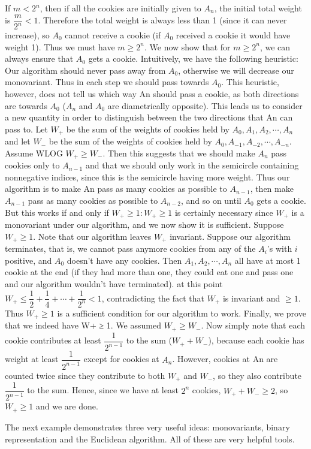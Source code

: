 \documentclass[a4paper,11pt]{book}
\begin{document}
\begin{soln}
If $m < 2^n$, then if all the cookies are initially given to $A_n$, the
initial total weight is $\dfrac{m}{2^n}< 1.$ Therefore the total weight is
always less than 1 (since it can never increase), so $A_0$ cannot
receive a cookie (if $A_0$ received a cookie it would have weight 1).
Thus we must have $m \ge 2^{n}.$
We now show that for $m \ge 2^{n}$, we can always ensure that $A_0$
gets a cookie. Intuitively, we have the following heuristic:
Our algorithm should never pass away from $A_0$, otherwise we will
decrease our monovariant. Thus in each step we should pass
towards $A_0$.
This heuristic, however, does not tell us which way An should
pass a cookie, as both directions are towards $A_0$ ($A_n$ and $A_0$ are
diametrically opposite). This leads us to consider a new quantity
in order to distinguish between the two directions that An can pass
to. Let $W_{+}$ be the sum of the weights of cookies held by $A_0, A_1, A_2,
\cdots, A_n$ and let $W_{-}$ be the sum of the weights of cookies held by $A_0,
A_{-1}, A_{-2}, \cdots, A_{-n}.$ Assume WLOG $W_{+} \ge W_{-}$. Then this suggests that we should make $A_n$ pass cookies only to $A_{n-1}$ and that we should only
work in the semicircle containing nonnegative indices, since this
is the semicircle having more weight. Thus our algorithm is to
make An pass as many cookies as possible to $A_{n-1}$, then make $A_{n-1}$
pass as many cookies as possible to $A_{n-2}$, and so on until $A_0$ gets a
cookie. But this works if and only if $W_+ \ge 1: W_+ \ge 1$ is certainly
necessary since $W_+$ is a monovariant under our algorithm, and we
now show it is sufficient.
Suppose $W_+ \ge 1$. Note that our algorithm leaves $W_+$ invariant.
Suppose our algorithm terminates, that is, we cannot pass
anymore cookies from any of the $A_i$’s with $i$ positive, and $A_0$
doesn’t have any cookies. Then $A_1, A_2, \cdots, A_n$ all have at most 1
cookie at the end (if they had more than one, they could eat one
and pass one and our algorithm wouldn’t have terminated).
at this point $W_{+} \le \dfrac{1}{2}+ \dfrac{1}{4} + \cdots + \dfrac{1}{2^{n}} <1$, contradicting the fact that
$W_+$ is invariant and $\ge 1$. Thus $W_+ \ge 1$ is a sufficient condition for
our algorithm to work.
Finally, we prove that we indeed have W+ ≥ 1. We assumed $W_+ \ge W_{-}$. Now simply note that each cookie contributes at least $\dfrac{1}{2^{n-1}}$ to
the sum ($W_+ + W_-$), because each cookie has weight at least $\dfrac{1}{2^{n-1}}$
except for cookies at $A_n$. However, cookies at An are counted twice
since they contribute to both $W_+$ and $W_-$, so they also contribute
$\dfrac{1}{2^{n-1}}$ to the sum. Hence, since we have at least $2^{n}$ cookies, $W_+ + W_{-}\ge 2$, so $W_+ \ge 1$ and we are done. 
\end{soln}
The next example demonstrates three very useful ideas:
monovariants, binary representation and the Euclidean algorithm.
All of these are very helpful tools.\\
\end{document}
